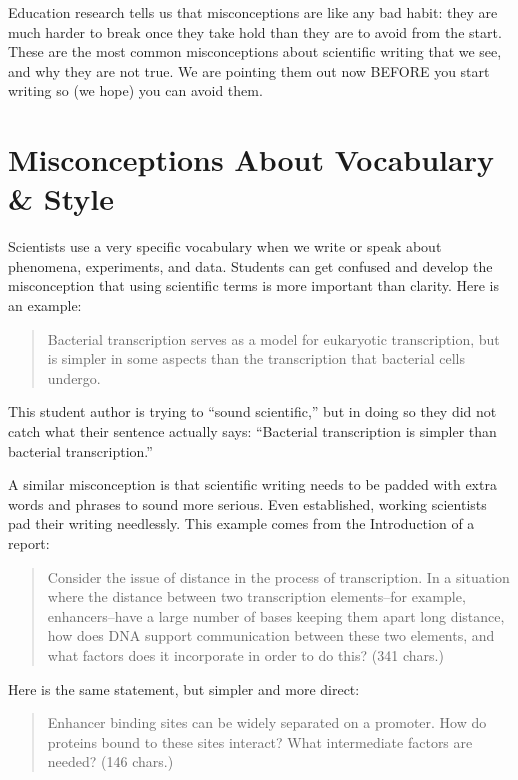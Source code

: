 \documentclass[
]{book}
\begin{document}
Education research tells us that misconceptions are like any bad habit: they are much harder to break once they take hold than they are to avoid from the start. These are the most common misconceptions about scientific writing that we see, and why they are not true. We are pointing them out now BEFORE you start writing so (we hope) you can avoid them.

\hypertarget{misconceptions-about-vocabulary-style}{%
\section{Misconceptions About Vocabulary \& Style}\label{misconceptions-about-vocabulary-style}}

Scientists use a very specific vocabulary when we write or speak about phenomena, experiments, and data. Students can get confused and develop the misconception that using scientific terms is more important than clarity. Here is an example:

\begin{quote}
Bacterial transcription serves as a model for eukaryotic transcription, but is simpler in some aspects than the transcription that bacterial cells undergo.
\end{quote}

This student author is trying to ``sound scientific,'' but in doing so they did not catch what their sentence actually says: ``Bacterial transcription is simpler than bacterial transcription.''

A similar misconception is that scientific writing needs to be padded with extra words and phrases to sound more serious. Even established, working scientists pad their writing needlessly. This example comes from the Introduction of a report:

\begin{quote}
Consider the issue of distance in the process of transcription. In a situation where the distance between two transcription elements--for example, enhancers--have a large number of bases keeping them apart long distance, how does DNA support communication between these two elements, and what factors does it incorporate in order to do this? (341 chars.)
\end{quote}

Here is the same statement, but simpler and more direct:

\begin{quote}
Enhancer binding sites can be widely separated on a promoter. How do proteins bound to these sites interact? What intermediate factors are needed? (146 chars.)
\end{quote}
\end{document}

